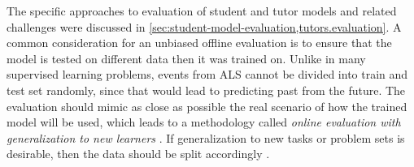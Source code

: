 The specific approaches to evaluation of student and tutor models and related challenges
were discussed in \cref{sec:student-model-evaluation,tutors.evaluation}.
A common consideration for an unbiased offline evaluation is to ensure that
the model is tested on different data then it was trained on.
Unlike in many supervised learning problems, events from ALS
cannot be divided into train and test set randomly, since that would lead
to predicting past from the future. %
The evaluation should mimic as close as possible the real scenario of how the
trained model will be used, which leads to a methodology called \emph{online
evaluation with generalization to new learners} \cite{pelanek-learner-modeling}.
If generalization to new tasks or problem sets %
is desirable, then the data should be split accordingly \cite{student-models-review-2012}.


%

